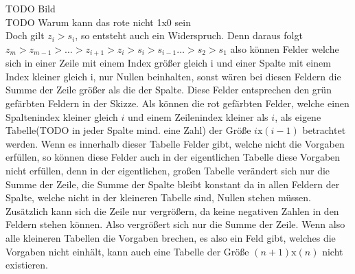 \documentclass[10pt, a4paper]{amsart}
\makeatletter
\renewenvironment{proof}[1][\proofname]{\par
\pushQED{\qed}%
\normalfont \topsep6\p@\@plus6\p@\relax
\trivlist
\item\relax
{\bfseries#1}\hspace\labelsep\ignorespaces
}{%
\popQED\endtrivlist\@endpefalse
}
\makeatother
\begin{document}
\begin{proof}
\begin{itemize}[itemsep=2ex]
    TODO Bild\\
    TODO Warum kann das rote nicht 1x0 sein\\
    
    Doch gilt $z_i>s_i$, so entsteht auch ein Widerspruch. Denn daraus folgt
    $z_m>z_{m-1}>\ldots>z_{i+1}>z_i>s_i>s_{i-1}\ldots>s_2>s_1$ also können
    Felder welche sich in einer Zeile mit einem Index größer gleich i und einer
    Spalte mit einem Index kleiner gleich i, nur Nullen beinhalten, sonst wären
    bei diesen Feldern die Summe der Zeile größer als die der Spalte. Diese
    Felder entsprechen den grün gefärbten Feldern in der Skizze. Als können die
    rot gefärbten Felder, welche einen Spaltenindex kleiner gleich $i$ und einem
    Zeilenindex kleiner als $i$, als eigene Tabelle(TODO in jeder Spalte mind.
    eine Zahl) der Größe $ i\text{x}(i-1) $ betrachtet werden. Wenn es innerhalb
    dieser Tabelle Felder gibt, welche nicht die Vorgaben erfüllen, so können
    diese Felder auch in der eigentlichen Tabelle diese Vorgaben nicht erfüllen,
    denn in der eigentlichen, großen Tabelle verändert sich nur die Summe der
    Zeile, die Summe der Spalte bleibt konstant da in allen Feldern der Spalte,
    welche nicht in der kleineren Tabelle sind, Nullen stehen müssen. Zusätzlich
    kann sich die Zeile nur vergrößern, da keine negativen Zahlen in den Feldern
    stehen können. Also vergrößert sich nur die Summe der Zeile. Wenn also alle
    kleineren Tabellen die Vorgaben brechen, es also ein Feld gibt, welches die
    Vorgaben nicht einhält, kann auch eine Tabelle der Größe $(n+1)\text{x}(n)$
    nicht existieren.
  \end{itemize}
\end{proof}
\end{document}
